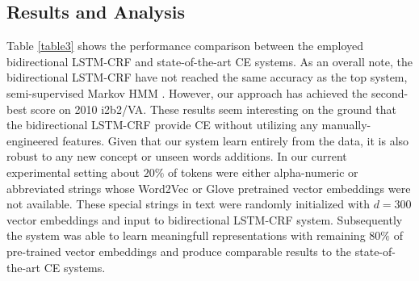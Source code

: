 \subsection{Results and Analysis}
\label{sec:result_analysis}
 Table \ref{table3} shows the performance comparison between the employed bidirectional LSTM-CRF and state-of-the-art CE systems. As an overall note, the bidirectional LSTM-CRF have not reached the same accuracy as the top system, semi-supervised Markov HMM  \cite{de2011machine}. However, our approach has achieved the second-best score on 2010 i2b2/VA. These results seem interesting on the ground that the bidirectional LSTM-CRF provide CE without utilizing any manually-engineered features. Given that our system learn entirely from the data, it is also robust to any new concept or unseen words additions. In our current experimental setting about $20\%$ of tokens were either alpha-numeric or abbreviated strings whose Word2Vec or  Glove pretrained vector embeddings were not available. These special strings in text were randomly initialized with $d=300$ vector embeddings and input to bidirectional LSTM-CRF system. Subsequently the system was able to learn  meaningfull representations with remaining $80\%$ of pre-trained vector embeddings and produce comparable results to the state-of-the-art CE systems.



